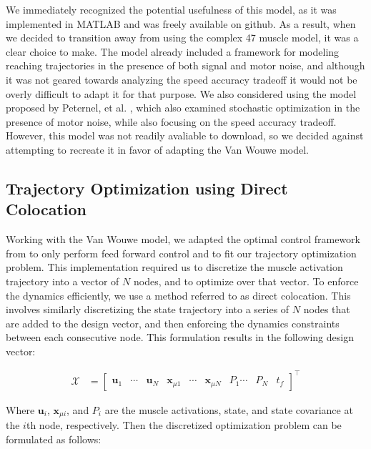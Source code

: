 \documentclass[table,12pt]{article}
\begin{document}
We immediately recognized the potential usefulness of this model, as it was implemented in MATLAB and was freely available on github. As a result, when we decided to transition away from using the complex 47 muscle model, it was a clear choice to make. The model already included a framework for modeling reaching trajectories in the presence of both signal and motor noise, and although it was not geared towards analyzing the speed accuracy tradeoff it would not be overly difficult to adapt it for that purpose. We also considered using the model proposed by Peternel, et al. \cite{c9}, which also examined stochastic optimization in the presence of motor noise, while also focusing on the speed accuracy tradeoff. However, this model was not readily avaliable to download, so we decided against attempting to recreate it in favor of adapting the Van Wouwe model.

\subsection{Trajectory Optimization using Direct Colocation}
Working with the Van Wouwe model, we adapted the optimal control framework from \cite{c7} to only perform feed forward control and to fit our trajectory optimization problem. This implementation required us to discretize the muscle activation trajectory into a vector of $N$ nodes, and to optimize over that vector. To enforce the dynamics efficiently, we use a method referred to as direct colocation. This involves similarly discretizing the state trajectory into a series of $N$ nodes that are added to the design vector, and then enforcing the dynamics constraints between each consecutive node. This formulation results in the following design vector:

\begin{align}
    \mathcal{X} &= \begin{bmatrix}
        \mathbf{u}_1 & \cdots & \mathbf{u}_N & \mathbf{x}_{\mu1} & \cdots & \mathbf{x}_{\mu N} & P_1 \cdots & P_N & t_f
    \end{bmatrix}^\top
\end{align}

Where $\mathbf{u}_i$, $\mathbf{x}_{\mu i}$, and $P_i$ are the muscle activations, state, and state covariance at the $i$th node, respectively. Then the discretized optimization problem can be formulated as follows:
\end{document}
